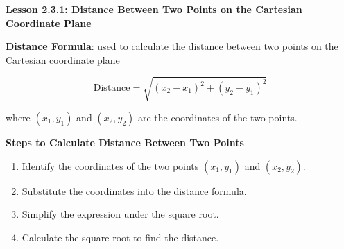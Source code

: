  \begin{center}
\textbf{Lesson 2.3.1: Distance Between Two Points on the Cartesian Coordinate Plane}
\end{center}

\vspace*{1ex}

\noindent\textbf{Distance Formula}: used to calculate the distance between two points on the Cartesian coordinate plane

\[
\text{Distance} = \sqrt{(x_2 - x_1)^2 + (y_2 - y_1)^2}
\]

where \((x_1, y_1)\) and \((x_2, y_2)\) are the coordinates of the two points.

\noindent\textbf{Steps to Calculate Distance Between Two Points}
\begin{enumerate}[label = \color{blue}\arabic*. ]
   \item Identify the coordinates of the two points \((x_1, y_1)\) and \((x_2, y_2)\).
   \item Substitute the coordinates into the distance formula.
   \item Simplify the expression under the square root.
   \item Calculate the square root to find the distance. 
\end{enumerate}
				 



 
